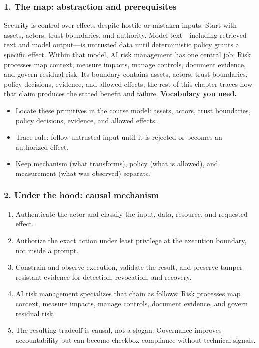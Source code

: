 \subsubsection*{1. The map: abstraction and prerequisites}
Security is control over effects despite hostile or mistaken inputs. Start with assets, actors, trust boundaries, and authority. Model text—including retrieved text and model output—is untrusted data until deterministic policy grants a specific effect.
Within that model, AI risk management has one central job: Risk processes map context, measure impacts, manage controls, document evidence, and govern residual risk. Its boundary contains assets, actors, trust boundaries, policy decisions, evidence, and allowed effects; the rest of this chapter traces how that claim produces the stated benefit and failure.
\textbf{Vocabulary you need.}\begin{itemize}
\item Locate these primitives in the course model: assets, actors, trust boundaries, policy decisions, evidence, and allowed effects.
\item Trace rule: follow untrusted input until it is rejected or becomes an authorized effect.
\item Keep mechanism (what transforms), policy (what is allowed), and measurement (what was observed) separate.
\end{itemize}
\subsubsection*{2. Under the hood: causal mechanism}\begin{enumerate}
\item Authenticate the actor and classify the input, data, resource, and requested effect.
\item Authorize the exact action under least privilege at the execution boundary, not inside a prompt.
\item Constrain and observe execution, validate the result, and preserve tamper-resistant evidence for detection, revocation, and recovery.
\item AI risk management specializes that chain as follows: Risk processes map context, measure impacts, manage controls, document evidence, and govern residual risk.
\item The resulting tradeoff is causal, not a slogan: Governance improves accountability but can become checkbox compliance without technical signals.
\end{enumerate}
